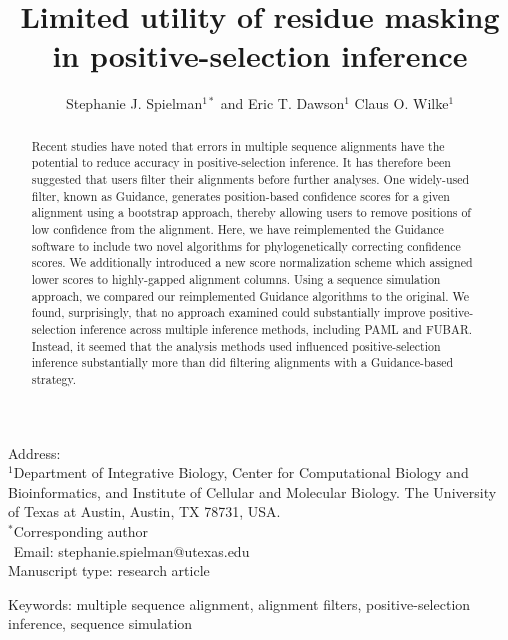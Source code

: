 \documentclass[10pt]{article}
\begin{document}
\title{\textbf{Limited utility of residue masking in positive-selection inference}}
\author{Stephanie J. Spielman$^{1*}$ and Eric T. Dawson$^{1}$ Claus O. Wilke$^{1}$}
\date{}

\maketitle
\noindent
Address:\\
$^1$Department of Integrative Biology, Center for Computational Biology and Bioinformatics, and Institute of Cellular and Molecular Biology.
The University of Texas at Austin, Austin, TX 78731, USA.\\

\bigskip
\noindent
$^*$Corresponding author\\
$\phantom{^*}$Email: stephanie.spielman@utexas.edu\\

\bigskip
\noindent
Manuscript type: research article

\bigskip
\noindent Keywords: multiple sequence alignment, alignment filters, positive-selection inference, sequence simulation

\newpage
\begin{abstract}
 Recent studies have noted that errors in multiple sequence alignments have the potential to reduce accuracy in positive-selection inference. It has therefore been suggested that users filter their alignments before further analyses. One widely-used filter, known as Guidance, generates position-based confidence scores for a given alignment using a bootstrap approach, thereby allowing users to remove positions of low confidence from the alignment. Here, we have reimplemented the Guidance software to include two novel algorithms for phylogenetically correcting confidence scores. We additionally introduced a new score normalization scheme which assigned lower scores to highly-gapped alignment columns. Using a sequence simulation approach, we compared our reimplemented Guidance algorithms to the original. We found, surprisingly, that no approach examined could substantially improve positive-selection inference across multiple inference methods, including PAML and FUBAR. Instead, it seemed that the analysis methods used influenced positive-selection inference substantially more than did filtering alignments with a Guidance-based strategy.
\end{abstract}
\end{document}
